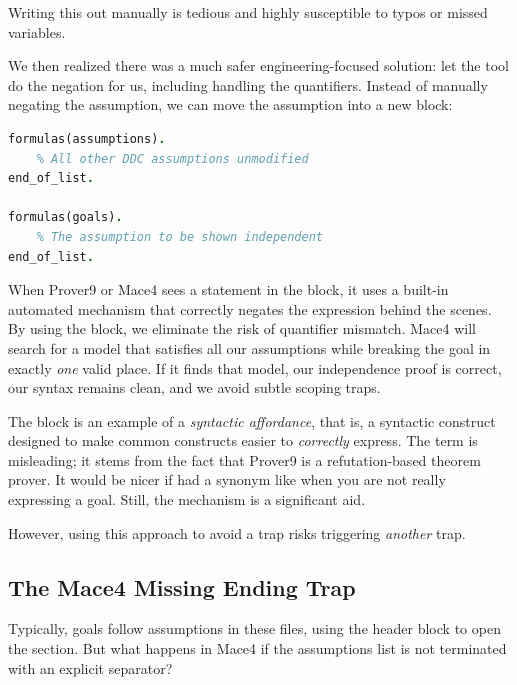 Writing this out manually is tedious and highly susceptible to typos or missed variables.

We then realized there was a much safer en\-gi\-neer\-ing-focused solution: let the tool do the negation for us, including handling the quantifiers. Instead of manually negating the assumption, we can move the assumption into a new  block:

\noindent
\begin{minipage}{\columnwidth}
\begin{lstlisting}[language=Prolog, caption={The safe alternative: move the target assumption into a \texttt{formulas(goals)} block.}]
formulas(assumptions).
    % All other DDC assumptions unmodified
end_of_list.

formulas(goals).
    % The assumption to be shown independent
end_of_list.
\end{lstlisting}
\end{minipage}

When Prover9 or Mace4 sees a statement in the  block, it uses a built-in automated mechanism that correctly negates the expression behind the scenes. By using the  block, we eliminate the risk of quantifier mismatch. Mace4 will search for a model that satisfies all our assumptions while breaking the goal in exactly \emph{one} valid place. If it finds that model, our independence proof is correct, our syntax remains clean, and we avoid subtle scoping traps.

The  block is an example of a \emph{syntactic affordance}, that is, a syntactic construct designed to make common constructs easier to \emph{correctly} express. The term  is misleading; it stems from the fact that Prover9 is a ref\-u\-ta\-tion-based theorem prover. It would be nicer if  had a synonym like  when you are not really expressing a goal. Still, the mechanism is a significant aid.

However, using this approach to avoid a trap risks triggering \emph{another} trap.

\subsection{The Mace4 Missing Ending Trap}

Typically, goals follow assumptions in these files, using the
header block to open the section. But what happens in Mace4 if the assumptions list is not terminated with an explicit  separator?


